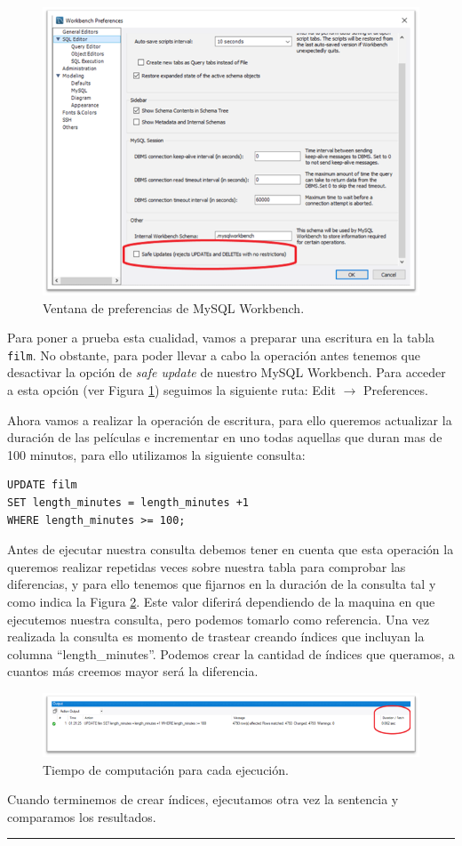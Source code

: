 \documentclass[a4paper]{article}
\begin{document}
\begin{figure}[ht]
    \centering
    \includegraphics[width=0.6\columnwidth]{figs/WorkbenchPreferences.png}
    \caption{Ventana de preferencias de MySQL Workbench.}\label{fig:preferences}
\end{figure}

Para poner a prueba esta cualidad, vamos a preparar una escritura en la tabla \texttt{film}. No obstante, para poder llevar a cabo la operación antes tenemos que desactivar la opción de \emph{safe update} de nuestro MySQL Workbench. Para acceder a esta opción (ver Figura \ref{fig:preferences}) seguimos la siguiente ruta: Edit $\rightarrow$ Preferences.

Ahora vamos a realizar la operación de escritura, para ello queremos actualizar la duración de las películas e incrementar en uno todas aquellas que duran mas de 100 minutos, para ello utilizamos la siguiente consulta:

\newpage

\begin{verbatim}
UPDATE film
SET length_minutes = length_minutes +1 
WHERE length_minutes >= 100;
\end{verbatim}

Antes de ejecutar nuestra consulta debemos tener en cuenta que esta operación la queremos realizar repetidas veces sobre nuestra tabla para comprobar las diferencias, y para ello tenemos que fijarnos en la duración de la consulta tal y como indica la Figura \ref{fig:tiempoEjecucion}. Este valor diferirá dependiendo de la maquina en que ejecutemos nuestra consulta, pero podemos tomarlo como referencia. Una vez realizada la consulta es momento de trastear creando índices que incluyan la columna ``length\_minutes''. Podemos crear la cantidad de índices que queramos, a cuantos más creemos mayor será la diferencia. 

\begin{figure}[ht]
    \centering
    \includegraphics[width=0.9\columnwidth]{figs/tiempoEjecucion.png}
    \caption{Tiempo de computación para cada ejecución.}\label{fig:tiempoEjecucion}
\end{figure}

Cuando terminemos de crear índices, ejecutamos otra vez la sentencia y comparamos los resultados.

\vspace{25em}
\hrule
\doclicenseThis
\end{document}
